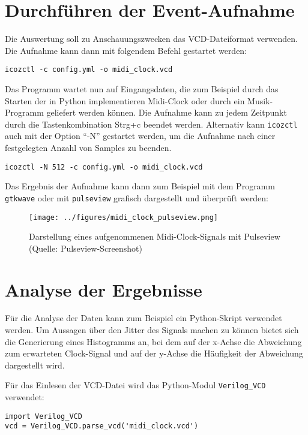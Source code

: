 \section{Durchführen der Event-Aufnahme}
\label{ch:Anwendungsfall:sec:Durchführung}

Die Auswertung soll zu Anschauungszwecken das \acrshort{VCD}-Dateiformat verwenden.
Die Aufnahme kann dann mit folgendem Befehl gestartet werden:
\begin{verbatim}
icozctl -c config.yml -o midi_clock.vcd
\end{verbatim}

Das Programm wartet nun auf Eingangsdaten, die zum Beispiel durch das Starten der in Python implementieren Midi-Clock oder durch ein Musik-Programm geliefert werden können.
Die Aufnahme kann zu jedem Zeitpunkt durch die Tastenkombination Strg+c beendet werden.
Alternativ kann {\tt icozctl} auch mit der Option ``-N'' gestartet werden, um die Aufnahme nach einer festgelegten Anzahl von Samples zu beenden. 
\begin{verbatim}
icozctl -N 512 -c config.yml -o midi_clock.vcd
\end{verbatim}
Das Ergebnis der Aufnahme kann dann zum Beispiel mit dem Programm {\tt gtkwave}\cite{web:gtkwave} oder mit {\tt pulseview}\cite{web:pulseview} grafisch dargestellt und überprüft werden:
\begin{figure}[H]
	\centering
	\captionsetup{justification=centering,margin=2cm}
		\texttt{[image: ../figures/midi\_clock\_pulseview.png]}
		\caption[Darstellung eines aufgenommenen Midi-Clock-Signals mit Pulseview]{Darstellung eines aufgenommenen Midi-Clock-Signals mit Pulseview (Quelle: Pulseview-Screenshot)}
	\label{fig:ice40_pmod_pins}
\end{figure}


\section{Analyse der Ergebnisse}
\label{ch:Anwendungsfall:sec:Analyse}

Für die Analyse der Daten kann zum Beispiel ein Python-Skript verwendet werden. Um Aussagen über den Jitter des Signals machen zu können bietet sich die Generierung eines Histogramms an, bei dem auf der x-Achse die Abweichung zum erwarteten Clock-Signal und auf der y-Achse die Häufigkeit der Abweichung dargestellt wird.

Für das Einlesen der VCD-Datei wird das Python-Modul {\tt Verilog\_VCD}\cite{web:verilog_vcd} verwendet:
\begin{verbatim}
import Verilog_VCD
vcd = Verilog_VCD.parse_vcd('midi_clock.vcd')
\end{verbatim}


